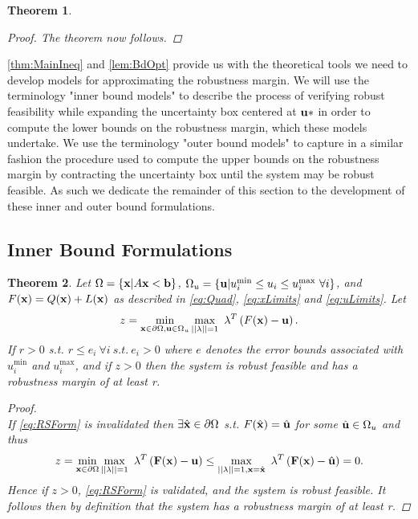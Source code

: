 \documentclass[11pt]{article}
\theoremstyle{plain}
\newtheorem{thm}{Theorem}[section]
\theoremstyle{definition}
\theoremstyle{remark}
\begin{document}
\begin{thm}
\begin{proof}
The theorem now follows.

\end{proof}
\end{thm}

\cref{thm:MainIneq} and \cref{lem:BdOpt} provide us with the theoretical tools we need to develop models for approximating the robustness margin.
We will use the terminology "inner bound models" to describe the process of verifying robust feasibility while expanding the uncertainty box centered at $\bold u*$ in order to compute the lower bounds on the robustness margin, which these models undertake. 
We use the terminology "outer bound models" to capture in a similar fashion the procedure used to compute the upper bounds on the robustness margin by contracting the uncertainty box until the system may be robust feasible. 
As such we dedicate the remainder of this section to the development of these inner and outer bound formulations. 

\subsection{Inner Bound Formulations}

\begin{thm}
Let $\Omega=\{\bold x| A\bold x< \bold b\}$, $\Omega_{u}=\{\bold u| u^{\min}_i\leq u_i \leq u^{\max}_i \ \forall i \}$, and $F(\bold x)=Q(\bold x)+L(\bold x)$ as described in \eqref{eq:Quad}, \eqref{eq:xLimits} and \eqref{eq:uLimits}. 
Let
$$z = \min\limits_{\bold x\in \partial \Omega, \bold u\in \Omega_{u} }\max\limits_{||\bold{\lambda}||=1}\ \bold{\lambda}^T\left(F(\bold x)-\bold u\right).$$
If $r>0$ s.t. $r\leq e_i \ \forall i \ s.t. \ e_i>0$ where $e$ denotes the error bounds associated with $ u^{\min}_i$ and $ u^{\max}_i$, and if $z>0$ then the system is robust feasible and has a robustness margin of at least r.

\begin{proof} \ \\
If \eqref{eq:RSForm} is invalidated then $\exists \hat{\bold x}\in\partial\Omega$ s.t. $F(\hat{\bold x})=\hat{\bold u}$ for some $\hat{\bold u}\in\Omega_{u}$ and thus $$z = \min\limits_{\bold x\in \partial \Omega}\max\limits_{||\bold{\lambda}||=1}\ \bold{\lambda}^T\left(\bold{F}(\bold x)-\bold u\right)\leq \max\limits_{||\bold{\lambda}||=1, \bold x=\hat{\bold x}}\ \bold{\lambda}^T\left(\bold{F}(\bold x)-\hat{\bold u}\right)=0.$$ 
Hence if $z>0$, \eqref{eq:RSForm} is validated, and the system is robust feasible. It follows then by definition that the system has a robustness margin of at least r.
\end{proof}
\end{thm}
\end{document}
